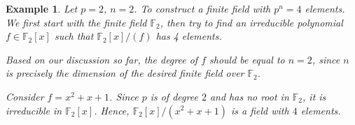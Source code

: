 \documentclass[a4paper,12pt]{report}
\newcounter{statement}
\numberwithin{statement}{chapter}
\newtheorem{eg}[statement]{\bf Example}
\numberwithin{equation}{chapter}
\numberwithin{section}{chapter}
\numberwithin{subsection}{section}
\begin{document}
\begin{eg}
Let $p = 2$, $n = 2$.  To construct a finite field with $p^n = 4$ elements.
We first start with the finite field $\mathbb{F}_2$,
then try to find an irreducible polynomial $f \in \mathbb{F}_2[x]$ such that
$\mathbb{F}_2[x]/(f)$ has 4 elements.


Based on our discussion so far,
the degree of $f$ should be equal to $n = 2$,
since $n$ is precisely the dimension of the desired finite field over $\mathbb{F}_2$.


Consider $f = x^2 + x + 1$.
Since $p$ is of degree $2$ and has no root in $\mathbb{F}_2$,
it is irreducible in $\mathbb{F}_2[x]$.  Hence, $\mathbb{F}_2[x]/(x^2 + x + 1)$
is a field with $4$ elements.

\end{eg}
\end{document}
